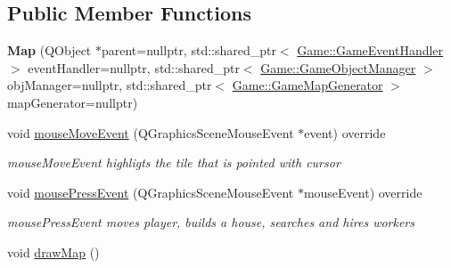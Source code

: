 \subsection*{Public Member Functions}
\begin{DoxyCompactItemize}
\item 
\hypertarget{class_game_1_1_map_ab35bc9a7f6eb93296195984acc3a7b91}{{\bfseries Map} (Q\-Object $\ast$parent=nullptr, std\-::shared\-\_\-ptr$<$ \hyperlink{class_game_1_1_game_event_handler}{Game\-::\-Game\-Event\-Handler} $>$ event\-Handler=nullptr, std\-::shared\-\_\-ptr$<$ \hyperlink{class_game_1_1_game_object_manager}{Game\-::\-Game\-Object\-Manager} $>$ obj\-Manager=nullptr, std\-::shared\-\_\-ptr$<$ \hyperlink{class_game_1_1_game_map_generator}{Game\-::\-Game\-Map\-Generator} $>$ map\-Generator=nullptr)}\label{class_game_1_1_map_ab35bc9a7f6eb93296195984acc3a7b91}

\item 
void \hyperlink{class_game_1_1_map_ad321530ce793b6aa4e0717f5273e3da5}{mouse\-Move\-Event} (Q\-Graphics\-Scene\-Mouse\-Event $\ast$event) override
\begin{DoxyCompactList}\small\item\em mouse\-Move\-Event highligts the tile that is pointed with cursor \end{DoxyCompactList}\item 
void \hyperlink{class_game_1_1_map_acd0b3b07cca5ead1401cf7eda3ad0e17}{mouse\-Press\-Event} (Q\-Graphics\-Scene\-Mouse\-Event $\ast$mouse\-Event) override
\begin{DoxyCompactList}\small\item\em mouse\-Press\-Event moves player, builds a house, searches and hires workers \end{DoxyCompactList}\item 
\hypertarget{class_game_1_1_map_aca53e9bced941a53bbb8778e051cbad0}{void \hyperlink{class_game_1_1_map_aca53e9bced941a53bbb8778e051cbad0}{draw\-Map} ()}\label{class_game_1_1_map_aca53e9bced941a53bbb8778e051cbad0}


\end{DoxyCompactItemize}
